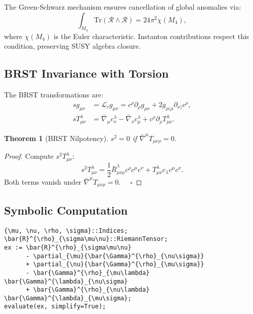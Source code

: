 \documentclass[12pt, onecolumn]{article}
\newtheorem{theorem}{Theorem}[section]
\theoremstyle{definition}
\numberwithin{equation}{section}
\begin{document}
\begin{appendices}
The Green-Schwarz mechanism ensures cancellation of global anomalies via:
\begin{equation}
    \int_{M_4} \text{Tr}(\mathcal{R} \wedge \mathcal{R}) = 24\pi^2 \chi(M_4), \label{eq:anomaly_cancel}
\end{equation}
where $\chi(M_4)$ is the Euler characteristic. Instanton contributions respect this condition, preserving SUSY algebra closure.

\subsection{BRST Invariance with Torsion}\label{sec:brst}
The BRST transformations are:
\begin{align}\label{eq:brst-trans}
s g_{\mu\nu} &= \mathcal{L}_c g_{\mu\nu} = c^\rho \partial_\rho g_{\mu\nu} + 2g_{\rho(\mu} \partial_{\nu)} c^\rho, \\[6pt]
s T^\lambda_{\mu\nu} &= \bar{\nabla}_\mu c^\lambda_\nu - \bar{\nabla}_\nu c^\lambda_\mu + c^\rho \partial_\rho T^\lambda_{\mu\nu}. \label{eq:brst-torsion}
\end{align}


\begin{theorem}[BRST Nilpotency]\label{thm:brst-nilpotency}
\( s^2 = 0 \) if \( \bar{\nabla}^\mu T_{\mu\nu\rho} = 0 \).
\end{theorem}

\begin{proof}
Compute \( s^2 T^\lambda_{\mu\nu} \):
\[
s^2 T^\lambda_{\mu\nu} = \frac{1}{2} \bar{R}^\lambda_{\mu\nu\rho} c^\rho c^\mu c^\nu + T^\lambda_{\mu\nu} c_\lambda c^\mu c^\nu.
\]
Both terms vanish under \( \bar{\nabla}^\mu T_{\mu\nu\rho} = 0 \). $\quad \square$
\end{proof}


\subsection{Symbolic Computation}\label{sec:cadabra}
\begin{verbatim}
{\mu, \nu, \rho, \sigma}::Indices;
\bar{R}^{\rho}_{\sigma\mu\nu}::RiemannTensor;
ex := \bar{R}^{\rho}_{\sigma\mu\nu} 
      - \partial_{\mu}{\bar{\Gamma}^{\rho}_{\nu\sigma}} 
      + \partial_{\nu}{\bar{\Gamma}^{\rho}_{\mu\sigma}} 
      - \bar{\Gamma}^{\rho}_{\mu\lambda} \bar{\Gamma}^{\lambda}_{\nu\sigma} 
      + \bar{\Gamma}^{\rho}_{\nu\lambda} \bar{\Gamma}^{\lambda}_{\mu\sigma};
evaluate(ex, simplify=True);
\end{verbatim}



\end{appendices}
\end{document}
